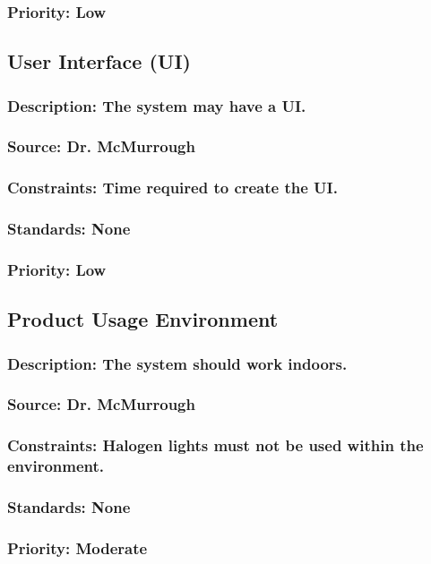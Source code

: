 \subsubsection{Priority: Low}

\subsection{User Interface (UI)}
\subsubsection{Description: The system may have a UI.}
\subsubsection{Source: Dr. McMurrough}
\subsubsection{Constraints: Time required to create the UI.}
\subsubsection{Standards: None}
\subsubsection{Priority: Low}

\subsection{Product Usage Environment}
\subsubsection{Description: The system should work indoors.}
\subsubsection{Source: Dr. McMurrough}
\subsubsection{Constraints: Halogen lights must not be used within the environment.}
\subsubsection{Standards: None}
\subsubsection{Priority: Moderate}

